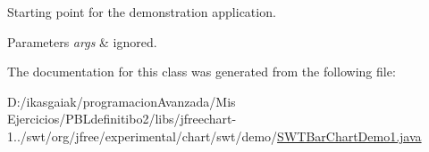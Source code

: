 Starting point for the demonstration application.


\begin{DoxyParams}{Parameters}
{\em args} & ignored. \\
\hline
\end{DoxyParams}


The documentation for this class was generated from the following file\+:\begin{DoxyCompactItemize}
\item 
D\+:/ikasgaiak/programacion\+Avanzada/\+Mis Ejercicios/\+P\+B\+Ldefinitibo2/libs/jfreechart-\/1../swt/org/jfree/experimental/chart/swt/demo/\mbox{\hyperlink{_s_w_t_bar_chart_demo1_8java}{S\+W\+T\+Bar\+Chart\+Demo1.\+java}}\end{DoxyCompactItemize}
